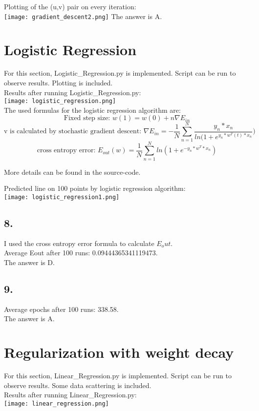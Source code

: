 \documentclass{homework}
\begin{document}
Plotting of the (u,v) pair on every iteration:\\
\texttt{[image: gradient\_descent2.png]}
The answer is A.

\section*{Logistic Regression}
For this section, Logistic\_Regression.py is implemented. Script can be run to observe results. Plotting is included.\\
Results after running Logistic\_Regression.py:\\
\texttt{[image: logistic\_regression.png]}\\

The used formulas for the logistic regression algorithm are:\\
\[\text{Fixed step size: } w(1) = w(0) + n\nabla E_{in} \]
\[\text{v is calculated by stochastic gradient descent: } \nabla E_{in} = -\frac{1}{N} \sum_{n=1}^N \frac{y_n*x_n}{ln(1 + e^{y_n*w^T(t)*x_n}})  \]
\[\text{cross entropy error: }E_{out}(w) = \frac{1}{N} \sum_{n=1}^N ln(1 + e^{-y_n*w^T*x_n})\]

More details can be found in the source-code.

Predicted line on 100 points by logistic regression algorithm:\\
\texttt{[image: logistic\_regression1.png]}

\subsection*{8.} 
I used the cross entropy error formula to calculate \(E_out\).\\

Average Eout after 100 runs: 0.09444365341119473.\\
The answer is D.
\subsection*{9.} 
Average epochs after 100 runs: 338.58.\\
The answer is A.

\section*{Regularization with weight decay}
For this section, Linear\_Regression.py is implemented. Script can be run to observe results. Some data scattering is included.\\
Results after running Linear\_Regression.py:\\
\texttt{[image: linear\_regression.png]}\\
\end{document}
